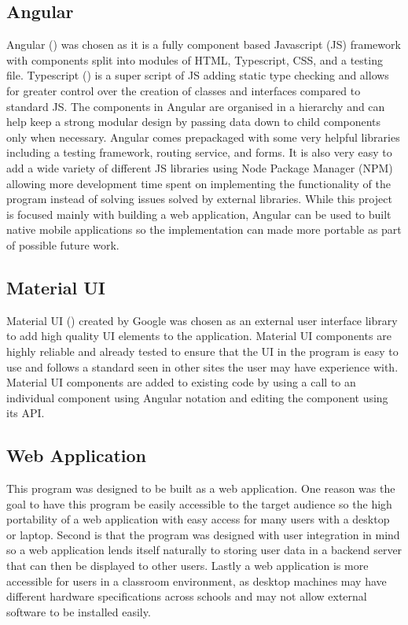 \documentclass{l4proj}
\begin{document}
\subsection{Angular}
Angular (\cite{noauthor_angular_nodate}) was chosen as it is a fully component based Javascript (JS) framework with components split into modules of HTML, Typescript, CSS, and a testing file. Typescript (\cite{noauthor_typed_nodate}) is a super script of JS adding static type checking and allows for greater control over the creation of classes and interfaces compared to standard JS. The components in Angular are organised in a hierarchy and can help keep a strong modular design by passing data down to child components only when necessary. Angular comes prepackaged with some very helpful libraries including a testing framework, routing service, and forms. It is also very easy to add a wide variety of different JS libraries using Node Package Manager (NPM) allowing more development time spent on implementing the functionality of the program instead of solving issues solved by external libraries. While this project is focused mainly with building a web application, Angular can be used to built native mobile applications so the implementation can made more portable as part of possible future work.

\subsection{Material UI}
Material UI (\cite{material}) created by Google was chosen as an external user interface library to add high quality UI elements to the application. Material UI components are highly reliable and already tested to ensure that the UI in the program is easy to use and follows a standard seen in other sites the user may have experience with. Material UI components are added to existing code by using a call to an individual component using Angular notation and editing the component using its API.

\subsection{Web Application}
This program was designed to be built as a web application. One reason was the goal to have this program be easily accessible to the target audience so the high portability of a web application with easy access for many users with a desktop or laptop. Second is that the program was designed with user integration in mind so a web application lends itself naturally to storing user data in a backend server that can then be displayed to other users. Lastly a web application is more accessible for users in a classroom environment, as desktop machines may have different hardware specifications across schools and may not allow external software to be installed easily.
\end{document}
